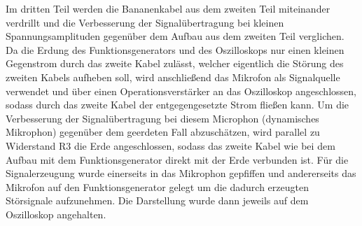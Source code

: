 \documentclass[12pt,a4paper]{article}
\begin{document}
Im dritten Teil werden die Bananenkabel aus dem zweiten Teil miteinander verdrillt und die Verbesserung der Signalübertragung bei kleinen Spannungsamplituden gegenüber dem Aufbau aus dem zweiten Teil verglichen.\newline
Da die Erdung des Funktionsgenerators und des Oszilloskops nur einen kleinen Gegenstrom durch das zweite Kabel zulässt, welcher eigentlich die Störung des zweiten Kabels aufheben soll, wird anschließend das Mikrofon als Signalquelle verwendet und über einen Operationsverstärker an das Oszilloskop angeschlossen, sodass durch das zweite Kabel der entgegengesetzte Strom fließen kann. Um die Verbesserung der Signalübertragung bei diesem Microphon (dynamisches Mikrophon) gegenüber dem geerdeten Fall abzuschätzen, wird parallel zu Widerstand R3 die Erde angeschlossen, sodass das zweite Kabel wie bei dem Aufbau mit dem Funktionsgenerator direkt mit der Erde verbunden ist. Für die Signalerzeugung wurde einerseits in das Mikrophon gepfiffen und andererseits das Mikrofon auf den Funktionsgenerator gelegt um die dadurch erzeugten Störsignale aufzunehmen. Die Darstellung wurde dann jeweils auf dem Oszilloskop angehalten.


\end{document}
